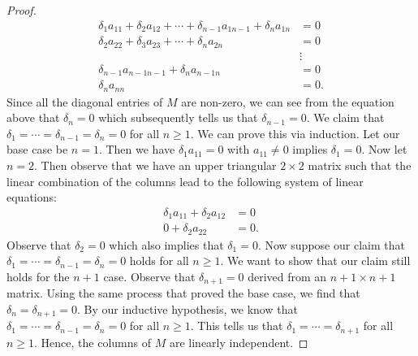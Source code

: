 \begin{proof}
\begin{align*}
    \delta_{1} a_{11} + \delta_{2} a_{12} + \cdots + \delta_{n-1} a_{1 n - 1} +  \delta_{n} a_{1n} &= 0 \\
      \delta_{2} a_{22} + \delta_{3} a_{23} + \cdots +  \delta_{n}  a_{2n} &= 0 \\
                                                                         &\vdots  \\
                                                                     \delta_{n-1} a_{n-1 n-1 } + \delta_{n} a_{n-1 n }     &= 0 \\
                                                                     \delta_{n} a_{n n } &= 0.
\end{align*}
Since all the diagonal entries of \( M  \) are non-zero, we can see from the equation above that \( \delta_{n } = 0  \) which subsequently tells us that \(  \delta_{n -1 } = 0  \). We claim that \( \delta_{1} =  \cdots =  \delta_{n-1} = \delta_{n } = 0  \) for all \( n \geq 1  \). We can prove this via induction. Let our base case be \( n = 1  \). Then we have \( \delta_{1} a_{11} = 0  \) with \( a_{11} \neq 0  \) implies \( \delta_{1} = 0  \). Now let \( n = 2  \). Then observe that we have an upper triangular \( 2 \times 2  \) matrix such that the linear combination of the columns lead to the following system of linear equations:
\begin{align*}
    \delta_{1} a_{11} + \delta_{2} a_{12} &= 0 \\
    0 + \delta_{2} a_{22} &= 0. 
\end{align*}
Observe that \( \delta_{2} = 0  \) which also implies that \( \delta_{1} =0  \). Now suppose our claim that \( \delta_{1} = \cdots =  \delta_{n-1} = \delta_{n} = 0   \) holds for all \( n \geq  1  \). We want to show that our claim still holds for the \( n + 1  \) case. Observe that \( \delta_{n + 1} = 0   \) derived from an \( n + 1 \times n  + 1  \) matrix. Using the same process that proved the base case, we find that \(  \delta_{n} = \delta_{n+1} = 0  \). By our inductive hypothesis, we know that \( \delta_{1} = \cdots =  \delta_{n-1} = \delta_{n} = 0  \) for all \( n \geq 1  \). This tells us that \( \delta_{1} = \cdots = \delta_{n+1} \) for all \( n \geq 1  \).  Hence, the columns of \( M  \) are linearly independent.  
\end{proof}

